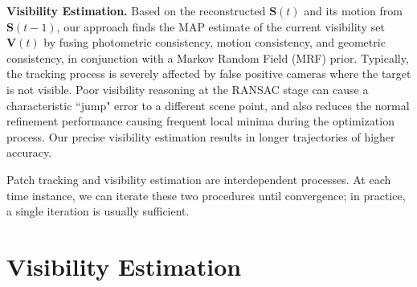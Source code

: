 \noindent \textbf{Visibility Estimation.} Based on the reconstructed $\mathbf{S}(t)$ and its motion from $\mathbf{S}(t-1)$, our approach finds the MAP estimate of the current visibility set $\mathbf{V}(t)$ by fusing photometric consistency, motion consistency, and geometric consistency, in conjunction with a Markov Random Field (MRF) prior. Typically, the tracking process is severely affected by false positive cameras where the target is not visible. Poor visibility reasoning at the RANSAC stage can cause a characteristic ``jump" error to a different scene point, and also reduces the normal refinement performance causing frequent local minima during the optimization process. Our precise visibility estimation results in longer trajectories of higher accuracy.

Patch tracking and visibility estimation are interdependent processes. At each time instance, we can iterate these two procedures until convergence; in practice, a single iteration is usually sufficient.  

\section{Visibility Estimation\label{sec:Optimal-Visibility-Estimation}}

